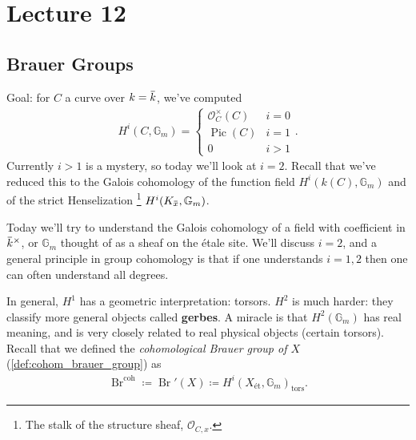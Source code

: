 \hypertarget{lecture-12}{%
\section{Lecture 12}\label{lecture-12}}

\hypertarget{brauer-groups-1}{%
\subsection{Brauer Groups}\label{brauer-groups-1}}

Goal: for \(C\) a curve over
\(k=\mkern 1.5mu\overline{\mkern-1.5muk\mkern-1.5mu}\mkern 1.5mu\),
we've computed
\begin{align*} 
H^i(C, {\mathbb{G}}_m) 
= 
\begin{cases}
{\mathcal{O}}_C^{\times}(C) & i=0\\
{\operatorname{Pic}}(C) & i=1 \\
0 & i > 1
\end{cases}
.\end{align*}
Currently \(i>1\) is a mystery, so today we'll look at \(i=2\). Recall
that we've reduced this to the Galois cohomology of the function field
\(H^i(k(C), {\mathbb{G}}_m)\) and of the strict Henselization
\footnote{The stalk of the structure sheaf, \({\mathcal{O}}_{C,x}\).}
\(H^i(K_{\mkern 1.5mu\overline{\mkern-1.5mux\mkern-1.5mu}\mkern 1.5mu}, {\mathbb{G}}_m)\).

Today we'll try to understand the Galois cohomology of a field with
coefficient in
\(\mkern 1.5mu\overline{\mkern-1.5muk\mkern-1.5mu}\mkern 1.5mu^{\times}\),
or \({\mathbb{G}}_m\) thought of as a sheaf on the étale site. We'll
discuss \(i=2\), and a general principle in group cohomology is that if
one understands \(i=1, 2\) then one can often understand all degrees.

In general, \(H^1\) has a geometric interpretation: torsors. \(H^2\) is
much harder: they classify more general objects called \textbf{gerbes}.
A miracle is that \(H^2({\mathbb{G}}_m)\) has real meaning, and is very
closely related to real physical objects (certain torsors). Recall that
we defined the \emph{cohomological Brauer group of \(X\)}
(\cref{def:cohom_brauer_group}) as
\begin{align*}  
\operatorname{Br}^{\operatorname{coh}}\coloneqq\operatorname{Br}'(X) \coloneqq H^i(X_\text{ét}, {\mathbb{G}}_m)_{{\operatorname{tors}}}
.\end{align*}

